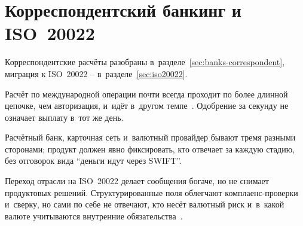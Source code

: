 
\section{Корреспондентский банкинг и ISO~20022}\label{sec:mc-correspondent}

Корреспондентские расчёты разобраны в~разделе~\ref{sec:banks-correspondent},
миграция к ISO~20022 -- в~разделе~\ref{sec:iso20022}.

Расчёт по международной операции почти всегда проходит по более
длинной цепочке, чем авторизация, и~идёт в~другом
темпе~\cite{fatf-correspondent-banking,swift-instant-interoperability}.
Одобрение за секунду не означает выплату в~тот же день.

Расчётный банк, карточная сеть и~валютный провайдер бывают тремя
разными сторонами; продукт должен явно фиксировать, кто отвечает
за каждую стадию, без отговорок вида \enquote{деньги идут через SWIFT}.

Переход отрасли на ISO~20022 делает сообщения богаче, но не
снимает продуктовых решений. Структурированные
поля облегчают комплаенс-проверки и~сверку, но сами по себе
не отвечают, кто несёт валютный риск и~в~какой валюте
учитываются внутренние обязательства~\cite{iso-20022,swift-iso20022-milestone,swift-transaction-manager-iso20022}.
